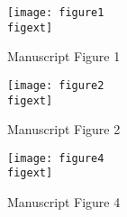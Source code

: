 \documentclass{article}
\begin{document}
\begin{figure}[H]
\texttt{[image: figure1\\figext]}
\caption*{Manuscript Figure 1}
\end{figure}



\begin{figure}[H]
\texttt{[image: figure2\\figext]}
\caption*{Manuscript Figure 2}
\end{figure}

\begin{figure}[H]
\texttt{[image: figure4\\figext]}
\caption*{Manuscript Figure 4}
\end{figure}

\thispagestyle{empty}
\end{document}
